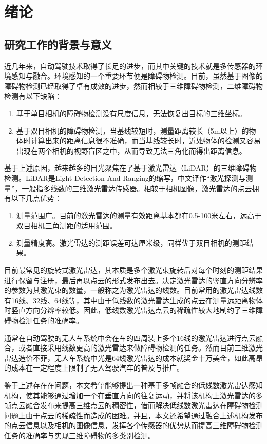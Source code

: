 
\chapter{绪论}
\section{研究工作的背景与意义}
近几年来，自动驾驶技术取得了长足的进步，而其中关键的技术就是多传感器的环境感知与融合。环境感知的一个重要环节便是障碍物检测。目前，虽然基于图像的障碍物检测已经取得了卓有成效的进步，然而相较于三维障碍物检测，二维障碍物检测有以下缺陷：
\begin{enumerate}
    \item 基于单目相机的障碍物检测没有尺度信息，无法恢复出目标的三维坐标。
    \item 基于双目相机的障碍物检测，当基线较短时，测量距离较长（5m以上）的物体时计算出来的距离信息很不准确，而当基线较长时，近处物体的检测又容易出现在两个相机的视野盲区之中，从而导致无法三角化而得出距离信息。
\end{enumerate}

基于上述原因，越来越多的目光聚焦在了基于激光雷达（LiDAR）的三维障碍物检测。LiDAR是Light Detection And Ranging的缩写，中文译作“激光探测与测量”，一般指多线数的三维激光雷达传感器。相较于相机图像，激光雷达的点云拥有以下几点优势：
\begin{enumerate}
    \item 测量范围广。目前的激光雷达的测量有效距离基本都在0.5-100米左右，远高于双目相机三角测距的适用范围。
    \item 测量精度高。激光雷达的测距误差可达厘米级，同样优于双目相机的测距结果。
\end{enumerate}

目前最常见的旋转式激光雷达，其本质是多个激光束旋转后对每个时刻的测距结果进行保留与注册，最后再以点云的形式发布出去。决定激光雷达的竖直方向分辨率的参数为其激光束的数量，一般称之为激光雷达的线数。目前常用的激光雷达线数有16线、32线、64线等，其中由于低线数的激光雷达生成的点云在测量远距离物体时竖直方向分辨率较低。因此，低线数激光雷达点云的稀疏性较大地制约了三维障碍物检测任务的准确率。

通常在自动驾驶的无人车系统中会在车的四周装上多个16线的激光雷达进行点云融合，或者直接采用线数更高的激光雷达来做障碍物检测的任务。然而目前三维激光雷达造价不菲，无人车系统中光是64线激光雷达的成本就奖金十万美金，如此高昂的成本在一定程度上限制了无人驾驶汽车的普及与推广。

鉴于上述存在在问题，本文希望能够提出一种基于多帧融合的低线数激光雷达感知机构，使其能够通过增加一个在垂直方向的往复运动，并将该机构上激光雷达的多帧点云融合发布来提高三维点云的稠密性，借而解决低线数激光雷达在障碍物检测问题上由于点云的稀疏性而造成的困难。并且，本文还希望通过融合上述机构发布的点云信息以及相机的图像信息，发挥各个传感器的优势从而提高三维障碍物检测任务的准确率与实现三维障碍物的多类别检测。

